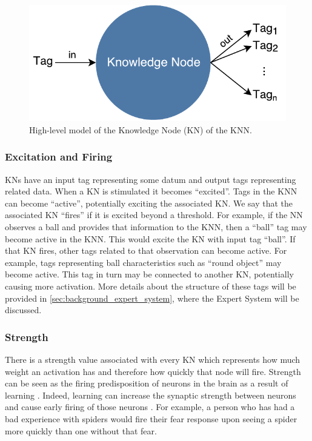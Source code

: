 \documentclass[titlepage,11pt]{article}
\begin{document}
\begin{figure}[!htb]
	\includegraphics[width=\columnwidth]{figures/knowledge_node.pdf}
	\caption[High-level model of the Knowledge Node of the KNN.]
	{High-level model of the Knowledge Node (KN) of the KNN.}
	\label{kn}
\end{figure}

\subsubsection{Excitation and Firing}
KNs have an input tag representing some datum and output tags representing related data. When a KN is stimulated it becomes ``excited''. Tags in the KNN can become ``active'', potentially exciting the associated KN. We say that the associated KN ``fires'' if it is excited beyond a threshold. For example, if the NN observes a ball and provides that information to the KNN, then a ``ball'' tag may become active in the KNN. This would excite the KN with input tag ``ball''. If that KN fires, other tags related to that observation can become active. For example, tags representing ball characteristics such as ``round object'' may become active. This tag in turn may be connected to another KN, potentially causing more activation. More details about the structure of these tags will be provided in \cref{sec:background_expert_system}, where the Expert System will be discussed.

\subsubsection{Strength}
There is a strength value associated with every KN which represents how much weight an activation has and therefore how quickly that node will fire. Strength can be seen as the firing predisposition of neurons in the brain as a result of learning \cite{vybihal-knowledge}. Indeed, learning can increase the synaptic strength between neurons and cause early  firing of those neurons \cite{hebb}. For example, a person who has had a bad experience with spiders would fire their fear response upon seeing a spider more quickly than one without that fear.
\end{document}
